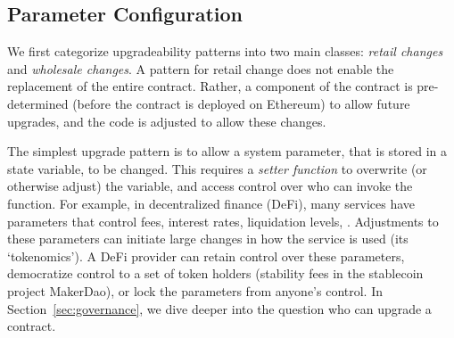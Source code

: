 

\subsection{Parameter Configuration}
\label{sec:parameter}

We first categorize upgradeability patterns into two main classes: \textit{retail changes} and \textit{wholesale changes}. A pattern for retail change does not enable the replacement of the entire contract. Rather, a component of the contract is pre-determined (before the contract is deployed on Ethereum) to allow future upgrades, and the code is adjusted to allow these changes. 

The simplest upgrade pattern is to allow a system parameter, that is stored in a state variable, to be changed. This requires a \textit{setter function} to overwrite (or otherwise adjust) the variable, and access control over who can invoke the function. For example, in decentralized finance (DeFi), many services have parameters that control fees, interest rates, liquidation levels, \etc. Adjustments to these parameters can initiate large changes in how the service is used (its `tokenomics'). A DeFi provider can retain control over these parameters, democratize control to a set of token holders (\eg stability fees in the stablecoin project MakerDao), or lock the parameters from anyone's control. In Section~\ref{sec:governance}, we dive deeper into the question who can upgrade a contract. 

